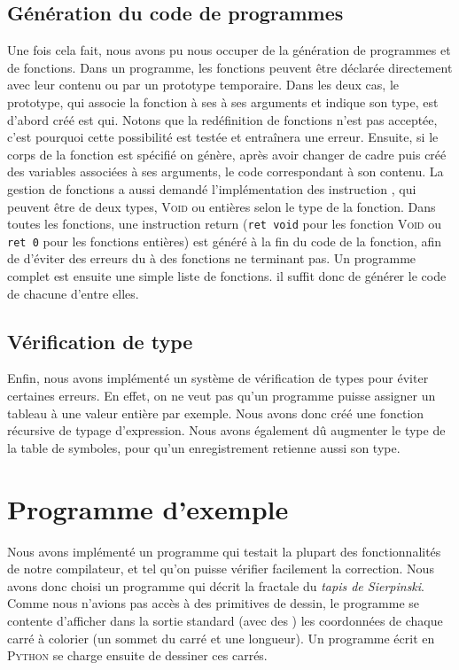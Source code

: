 \documentclass[french]{article}
\begin{document}
  \subsection{Génération du code de programmes}
Une fois cela fait, nous avons pu nous occuper de la génération de programmes et de fonctions. Dans un programme, les fonctions peuvent être déclarée directement avec leur contenu ou par un prototype temporaire. Dans les deux cas, le prototype, qui associe la fonction à ses à ses arguments et indique son type, est d'abord créé est qui. Notons que la redéfinition de fonctions n'est pas acceptée, c'est pourquoi cette possibilité est testée et entraînera une erreur. Ensuite, si le corps de la fonction est spécifié on génère, après avoir changer de cadre puis créé des variables associées à ses arguments, le code correspondant à son contenu. La gestion de fonctions a aussi demandé l'implémentation des instruction \return, qui peuvent être de deux types, \textsc{Void} ou entières selon le type de la fonction. Dans toutes les fonctions, une instruction return (\texttt{ret void} pour les fonction \textsc{Void} ou \texttt{ret 0} pour les fonctions entières) est généré à la fin du code de la fonction, afin de d'éviter des erreurs du à des fonctions ne terminant pas.
Un programme complet est ensuite une simple liste de fonctions. il suffit donc de générer le code de chacune d'entre elles.
  \subsection{Vérification de type}
  Enfin, nous avons implémenté un système de vérification de types pour éviter certaines erreurs. En effet, on ne veut pas qu'un programme puisse assigner un tableau à une valeur entière par exemple. Nous avons donc créé une fonction récursive de typage d'expression. Nous avons également dû augmenter le type de la table de symboles, pour qu'un enregistrement retienne aussi son type.

  
\section{Programme d'exemple}
Nous avons implémenté un programme qui testait la plupart des fonctionnalités de notre compilateur, et tel qu'on puisse vérifier facilement la correction. Nous avons donc choisi un programme qui décrit la fractale du \textit{tapis de Sierpinski}. Comme nous n'avions pas accès à des primitives de dessin, le programme se contente d'afficher dans la sortie standard (avec des \iprint) les coordonnées de chaque carré à colorier (un sommet du carré et une longueur). Un programme écrit en \textsc{Python} se charge ensuite de dessiner ces carrés.
\end{document}
